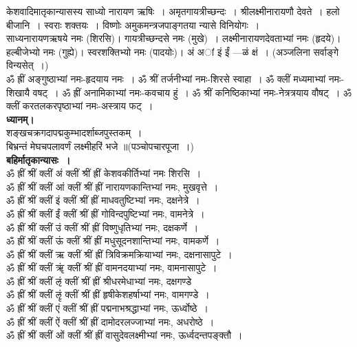 \documentclass[twoside,top=1.7cm, bottom=1.7cm, outer=1cm,landscape, inner=1.5cm,a5paper,]{book}
\begin{document}
केशवादिमातृकान्यासस्य साध्यो नारायण ऋषिः~। अमृतगायत्रीच्छन्दः~। श्रीलक्ष्मीनारायणौ देवते~। हलो बीजानि~। स्वराः शक्तयः~। विष्णोः अमुकमन्त्रजपाङ्गतया न्यासे विनियोगः~।\\
साध्यनारायणऋषये नमः (शिरसि)। गायत्रीच्छन्दसे नमः (मुखे)~। लक्ष्मीनारायणदेवताभ्यां नमः (हृदये)। हल्बीजेभ्यो नमः (गुह्ये)। स्वरशक्तिभ्यो नमः (पादयोः)।
अं अां  इं ईं ---ळं क्षं~। (अञ्जलिना सर्वाङ्गे विन्यसेत्~।)\\
ॐ ह्रीं अङ्गुष्ठाभ्यां नमः-हृदयाय नमः~। 
ॐ श्रीं तर्जनीभ्यां नमः-शिरसे स्वाहा~।
ॐ क्लीं मध्यमाभ्यां नमः-शिखायै वषट्~।
ॐ ह्रीं  अनामिकाभ्यां नमः-कवचाय हुं~।
ॐ श्रीं कनिष्ठिकाभ्यां नमः-नेत्रत्रयाय वौषट्~।
ॐ क्लीं करतलकरपृष्ठाभ्यां नमः-अस्त्राय फट्~।\\[10pt]
{\bfseries ध्यानम्।}\\
शङ्खचक्रगदापद्मकुम्भादर्शाब्जपुस्तकम्~।\\
बिभ्रन्तं मेघचपलावर्णं लक्ष्मीहरिं भजे ॥(पञ्चोपचारपूजा~।)\\[10pt]
{\bfseries बहिर्मातृकान्यासः~।}\\
ॐ ह्रीं श्रीं क्लीं अं क्लीं श्रीं ह्रीं केशवकीर्तिभ्यां नमः शिरसि~।\\
ॐ ह्रीं श्रीं क्लीं आं क्लीं श्रीं ह्रीं नारायणकान्तिभ्यां नमः, मुखवृत्ते~।\\
ॐ ह्रीं श्रीं क्लीं इं क्लीं श्रीं ह्रीं माधवतुष्टिभ्यां नमः, दक्षनेत्रे~।\\
ॐ ह्रीं श्रीं क्लीं ईं क्लीं श्रीं ह्रीं गोविन्दपुष्टिभ्यां नमः, वामनेत्रे~।\\
ॐ ह्रीं श्रीं क्लीं उं क्लीं श्रीं ह्रीं विष्णुधृतिभ्यां नमः, दक्षकर्णे~।\\
ॐ ह्रीं श्रीं क्लीं ऊं क्लीं श्रीं ह्रीं मधुसूदनशान्तिभ्यां नमः, वामकर्णे~।\\
ॐ ह्रीं श्रीं क्लीं ऋ क्लीं श्रीं ह्रीं त्रिविक्रमक्रियाभ्यां नमः, दक्षनासापुटे~।\\
ॐ ह्रीं श्रीं क्लीं ॠं क्लीं श्रीं ह्रीं वामनदयाभ्यां नमः, वामनासापुटे~।\\
ॐ ह्रीं श्रीं क्लीं ऌं क्लीं श्रीं ह्रीं श्रीधरमेधाभ्यां नमः, दक्षगण्डे\\
ॐ ह्रीं श्रीं क्लीं ऌृं क्लीं श्रीं ह्रीं हृषीकेशहर्षाभ्यां नमः, वामगण्डे~।\\
ॐ ह्रीं श्रीं क्लीं एं क्लीं श्रीं ह्रीं पद्मनाभश्रद्धाभ्यां नमः, ऊर्ध्वोष्ठे~।\\
ॐ ह्रीं श्रीं क्लीं ऐं क्लीं श्रीं ह्रीं दामोदरलज्जाभ्यां नमः, अधरोष्ठे~।\\
ॐ ह्रीं श्रीं क्लीं ओं क्लीं श्रीं ह्रीं वासुदेवलक्ष्मीभ्यां नमः, ऊर्ध्वदन्तपङ्क्तौ~।\\
\end{document}
